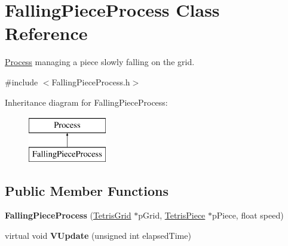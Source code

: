 \hypertarget{classFallingPieceProcess}{\section{Falling\-Piece\-Process Class Reference}
\label{classFallingPieceProcess}
}


\hyperlink{classProcess}{Process} managing a piece slowly falling on the grid.  




{\ttfamily \#include $<$Falling\-Piece\-Process.\-h$>$}

Inheritance diagram for Falling\-Piece\-Process\-:\begin{figure}[H]
\begin{center}
\leavevmode
\includegraphics[height=2.000000cm]{classFallingPieceProcess}
\end{center}
\end{figure}
\subsection*{Public Member Functions}
\begin{DoxyCompactItemize}
\item 
\hypertarget{classFallingPieceProcess_acc536145c7ed4d0e371de7413c7d8a53}{{\bfseries Falling\-Piece\-Process} (\hyperlink{classTetrisGrid}{Tetris\-Grid} $\ast$p\-Grid, \hyperlink{classTetrisPiece}{Tetris\-Piece} $\ast$p\-Piece, float speed)}\label{classFallingPieceProcess_acc536145c7ed4d0e371de7413c7d8a53}

\item 
\hypertarget{classFallingPieceProcess_a5004a880b6c10709d076e14749aa5727}{virtual void {\bfseries V\-Update} (unsigned int elapsed\-Time)}\label{classFallingPieceProcess_a5004a880b6c10709d076e14749aa5727}

\end{DoxyCompactItemize}
